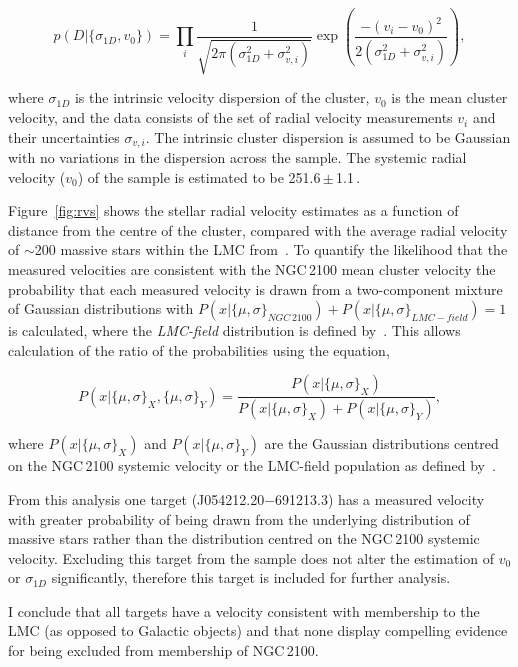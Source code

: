 \begin{equation}
p(D|\{\sigma_{1D}, v_0\}) = \prod_i \frac{1}{\sqrt{2 \pi (\sigma_{1D}^2+ \sigma_{v, i}^2)}}  \exp{\left(\frac{-(v_i - v_0)^2}{2 (\sigma_{1D}^2+ \sigma_{v, i}^2)}\right)},
\label{eq:like}
\end{equation}

\noindent where $\sigma_{1D}$ is the intrinsic velocity dispersion of the cluster, $v_0$ is the mean cluster velocity, and the data consists of the set of radial velocity measurements $v_i$ and their uncertainties $\sigma_{v, i}$.
The intrinsic cluster dispersion is assumed to be Gaussian with no variations in the dispersion across the sample.
The systemic radial velocity ($v_0$) of the sample is estimated to be 251.6\,$\pm$\,1.1\,\kms.

Figure~\ref{fig:rvs} shows the stellar radial velocity estimates as a function of distance from the centre of the cluster, compared with the average radial velocity of $\sim$200 massive stars within the LMC from~\citet[][green dashed line]{2015A&A...584A...5E}.
To quantify the likelihood that the measured velocities are consistent with the NGC\,2100 mean cluster velocity the probability that each measured velocity is drawn from a two-component mixture of Gaussian distributions with
$P(x|\{\mu, \sigma\}_{NGC\,2100}) + P(x|\{\mu, \sigma\}_{LMC-field}) = 1$ is calculated,
where the {\it LMC-field} distribution is defined by~\cite{2015A&A...584A...5E}.
This allows calculation of the ratio of the probabilities using the equation,

\begin{equation}
    P(x|\{\mu, \sigma\}_X,\{\mu, \sigma\}_Y) = \frac{P(x|\{\mu, \sigma\}_X)}{P(x|\{\mu, \sigma\}_X) + P(x|\{\mu, \sigma\}_Y)},
\end{equation}

where $P(x|\{\mu, \sigma\}_X)$ and $P(x|\{\mu, \sigma\}_Y)$ are the Gaussian distributions centred on the NGC\,2100 systemic velocity or the LMC-field population as defined by~\cite{2015A&A...584A...5E}.

From this analysis one target (J054212.20$-$691213.3) has a measured velocity with greater probability of being drawn from the underlying distribution of massive stars rather than the distribution centred on the NGC\,2100 systemic velocity.
Excluding this target from the sample does not alter the estimation of $v_0$ or $\sigma_{1D}$ significantly, therefore this target is included for further analysis.

I conclude that all targets have a velocity consistent with membership to the LMC (as opposed to Galactic objects) and that none display compelling evidence for being excluded from membership of NGC\,2100.

